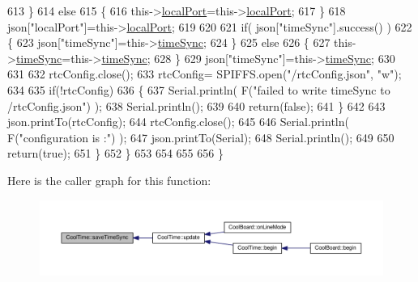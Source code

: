 \begin{DoxyCode}
613             \}
614             \textcolor{keywordflow}{else}
615             \{
616                 this->\hyperlink{classCoolTime_a2f777da44d7ba678be8185299e9b49d1}{localPort}=this->\hyperlink{classCoolTime_a2f777da44d7ba678be8185299e9b49d1}{localPort};
617             \}
618             json[\textcolor{stringliteral}{"localPort"}]=this->\hyperlink{classCoolTime_a2f777da44d7ba678be8185299e9b49d1}{localPort};
619 
620 
621             \textcolor{keywordflow}{if}( json[\textcolor{stringliteral}{"timeSync"}].success() )
622             \{
623                 json[\textcolor{stringliteral}{"timeSync"}]=this->\hyperlink{classCoolTime_a9d032e76c3470a15b3bbbc52af6463f7}{timeSync};
624             \}
625             \textcolor{keywordflow}{else}
626             \{
627                 this->\hyperlink{classCoolTime_a9d032e76c3470a15b3bbbc52af6463f7}{timeSync}=this->\hyperlink{classCoolTime_a9d032e76c3470a15b3bbbc52af6463f7}{timeSync};
628             \}
629             json[\textcolor{stringliteral}{"timeSync"}]=this->\hyperlink{classCoolTime_a9d032e76c3470a15b3bbbc52af6463f7}{timeSync};
630 
631 
632             rtcConfig.close();
633             rtcConfig= SPIFFS.open(\textcolor{stringliteral}{"/rtcConfig.json"}, \textcolor{stringliteral}{"w"});
634             
635             \textcolor{keywordflow}{if}(!rtcConfig)
636             \{
637                 Serial.println( F(\textcolor{stringliteral}{"failed to write timeSync to /rtcConfig.json"}) );
638                 Serial.println();
639 
640                 \textcolor{keywordflow}{return}(\textcolor{keyword}{false});
641             \}
642             
643             json.printTo(rtcConfig);
644             rtcConfig.close();
645 
646             Serial.println( F(\textcolor{stringliteral}{"configuration is :"}) );
647             json.printTo(Serial);
648             Serial.println();
649         
650             \textcolor{keywordflow}{return}(\textcolor{keyword}{true}); 
651         \}
652     \}   
653 
654 
655 
656 \}
\end{DoxyCode}
Here is the caller graph for this function\+:
\nopagebreak
\begin{figure}[H]
\begin{center}
\leavevmode
\includegraphics[width=350pt]{classCoolTime_ae9658c9b377510d469e3b88edf33ee85_icgraph}
\end{center}
\end{figure}
\mbox{\label{classCoolTime_a236a38d120dc53bc67456d763838c5a1}} 
